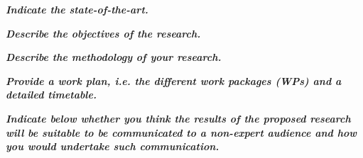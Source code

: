 \documentclass[11pt,a4paper]{article}
\begin{document}
\begin{center}  
\textbf{\textit{{\Large Indicate the state-of-the-art.}}}\\
\end{center}



\begin{center}
\textbf{\textit{{\Large Describe the objectives of the research.}}}\\
\end{center}


\begin{center}
\textbf{\textit{{\Large Describe the methodology of your research.}}}\\
\end{center}


\begin{center}
\textbf{\textit{{\Large Provide a work plan, i.e. the different work packages (WPs) and a detailed timetable.}}}\\
\end{center}


\newpage
\begin{center}
\textbf{\textit{{\Large Indicate below whether you think the results of the proposed research will be suitable to be communicated to a non-expert audience and how you would undertake such communication.}}}\\
\end{center}


%



\newpage


%
\end{document}
